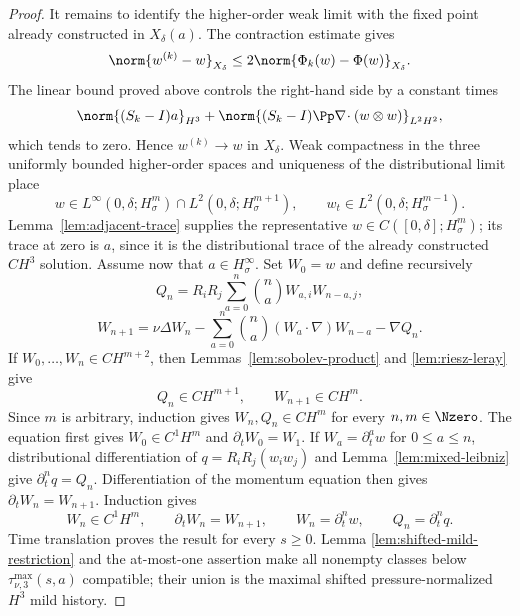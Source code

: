 \begin{proof}
It remains to identify the higher-order weak limit with the fixed point already
constructed in \(X_\delta(a)\).  The contraction estimate gives
\[
 \norm{w^{(k)}-w}_{X_\delta}
 \le2\norm{\Phi_k(w)-\Phi(w)}_{X_\delta}.
\]
The linear bound proved above controls the right-hand side by a constant times
\[
 \norm{(S_k-I)a}_{H^3}
 +\norm{(S_k-I)\Pp\nabla\!\cdot(w\otimes w)}_{L^2H^2},
\]
which tends to zero.  Hence \(w^{(k)}\to w\) in \(X_\delta\).  Weak
compactness in the three uniformly bounded higher-order spaces and uniqueness
of the distributional limit place
\[
 w\in L^\infty(0,\delta;H^m_\sigma)\cap L^2(0,\delta;H^{m+1}_\sigma),
 \qquad w_t\in L^2(0,\delta;H^{m-1}_\sigma).
\]
Lemma~\ref{lem:adjacent-trace} supplies the representative
\(w\in C([0,\delta];H^m_\sigma)\); its trace at zero is \(a\), since it is
the distributional trace of the already constructed \(C H^3\) solution.
Assume now that \(a\in H^\infty_\sigma\).  Set \(W_0=w\) and define
recursively
\[
 Q_n=R_iR_j\sum_{a=0}^n\binom naW_{a,i}W_{n-a,j},
\]
\[
 W_{n+1}=\nu\Delta W_n
 -\sum_{a=0}^n\binom na(W_a\cdot\nabla)W_{n-a}-\nabla Q_n.
\]
If \(W_0,\ldots,W_n\in C H^{m+2}\), then
Lemmas~\ref{lem:sobolev-product} and \ref{lem:riesz-leray} give
\[
 Q_n\in C H^{m+1},
 \qquad
 W_{n+1}\in C H^m.
\]
Since \(m\) is arbitrary, induction gives \(W_n,Q_n\in C H^m\) for every
\(n,m\in\Nzero\).  The equation first gives
\(W_0\in C^1H^m\) and \(\partial_tW_0=W_1\).  If
\(W_a=\partial_t^aw\) for \(0\le a\le n\), distributional differentiation
of \(q=R_iR_j(w_iw_j)\) and Lemma~\ref{lem:mixed-leibniz} give
\(\partial_t^nq=Q_n\).  Differentiation of the momentum equation then gives
\(\partial_tW_n=W_{n+1}\).  Induction gives
\[
 W_n\in C^1H^m,
 \qquad
 \partial_tW_n=W_{n+1},
 \qquad
 W_n=\partial_t^nw,
 \qquad
 Q_n=\partial_t^nq.
\]
Time translation proves the result for every \(s\ge0\).  Lemma
\ref{lem:shifted-mild-restriction} and the at-most-one assertion make all
nonempty classes below \(\tau_{\nu,3}^{\max}(s,a)\) compatible; their union
is the maximal shifted pressure-normalized \(H^3\) mild history.
\end{proof}
